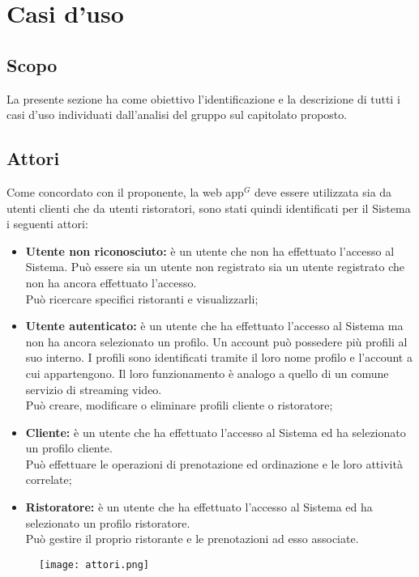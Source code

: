\section{Casi d'uso}
\subsection{Scopo}

La presente sezione ha come obiettivo l'identificazione e la descrizione di tutti i casi d'uso individuati dall'analisi del gruppo sul capitolato proposto.
    
\subsection{Attori}
Come concordato con il proponente, la web app$^{G}$ deve essere utilizzata sia da utenti clienti che da utenti ristoratori, sono stati quindi identificati per il Sistema i seguenti attori:
\begin{itemize}
    \item \textbf{Utente non riconosciuto:} è un utente che non ha effettuato l'accesso al Sistema. Può essere sia un utente non registrato sia un utente registrato che non ha ancora effettuato l'accesso.\\
    Può ricercare specifici ristoranti e visualizzarli;
    \item \textbf{Utente autenticato:} è un utente che ha effettuato l'accesso al Sistema ma non ha ancora selezionato un profilo. Un account può possedere più profili al suo interno. I profili sono identificati tramite il loro nome profilo e l'account a cui appartengono. Il loro funzionamento è analogo a quello di un comune servizio di streaming video. \\
    Può creare, modificare o eliminare profili cliente o ristoratore;
    \item \textbf{Cliente:} è un utente che ha effettuato l'accesso al Sistema ed ha selezionato un profilo cliente.\\
    Può effettuare le operazioni di prenotazione ed ordinazione e le loro attività correlate;
    \item \textbf{Ristoratore:} è un utente che ha effettuato l'accesso al Sistema ed ha selezionato un profilo ristoratore.\\
    Può gestire il proprio ristorante e le prenotazioni ad esso associate.
\end{itemize}
\begin{figure}[h] \texttt{[image: attori.png]} \end{figure}

